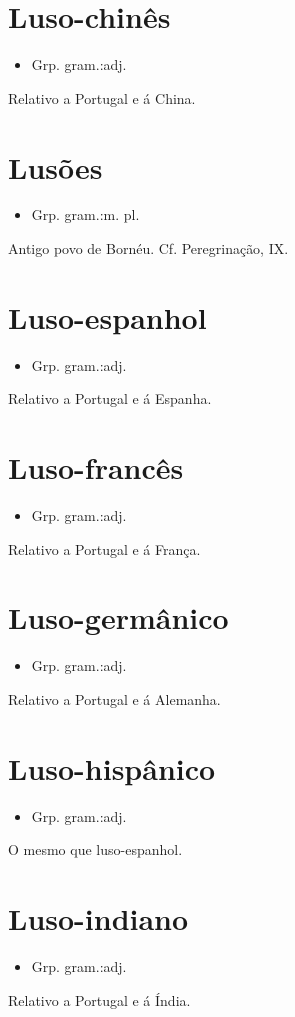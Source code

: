 \section{Luso-chinês}
\begin{itemize}
\item {Grp. gram.:adj.}
\end{itemize}
Relativo a Portugal e á China.
\section{Lusões}
\begin{itemize}
\item {Grp. gram.:m. pl.}
\end{itemize}
Antigo povo de Bornéu. Cf. \textunderscore Peregrinação\textunderscore , IX.
\section{Luso-espanhol}
\begin{itemize}
\item {Grp. gram.:adj.}
\end{itemize}
Relativo a Portugal e á Espanha.
\section{Luso-francês}
\begin{itemize}
\item {Grp. gram.:adj.}
\end{itemize}
Relativo a Portugal e á França.
\section{Luso-germânico}
\begin{itemize}
\item {Grp. gram.:adj.}
\end{itemize}
Relativo a Portugal e á Alemanha.
\section{Luso-hispânico}
\begin{itemize}
\item {Grp. gram.:adj.}
\end{itemize}
O mesmo que \textunderscore luso-espanhol\textunderscore .
\section{Luso-indiano}
\begin{itemize}
\item {Grp. gram.:adj.}
\end{itemize}
Relativo a Portugal e á Índia.
